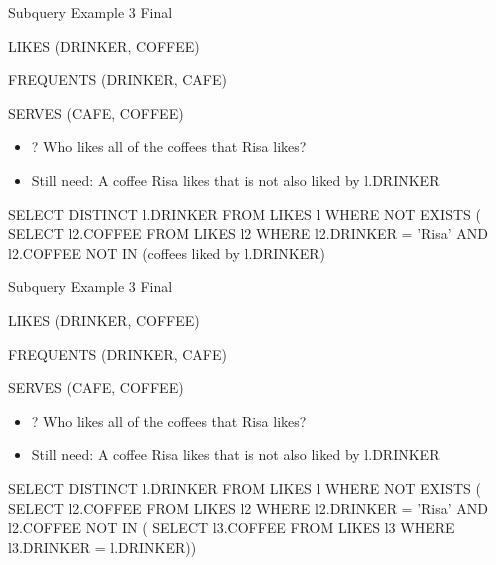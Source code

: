 \documentclass[aspectratio=169]{beamer}
\newenvironment{noindentitemize}
{ \begin{itemize}
 \setlength{\itemsep}{1.5ex}
  \setlength{\parsep}{0pt}   
  \setlength{\parskip}{0pt}
 \addtolength{\leftskip}{-2em}
 }
{ \end{itemize} }
\begin{document}
\begin{frame}[fragile]{Subquery Example 3 Final}

LIKES (DRINKER, COFFEE)

FREQUENTS (DRINKER, CAFE)

SERVES (CAFE, COFFEE)


\begin{noindentitemize}
\item[?] Who likes all of the coffees that Risa likes?
\item Still need: A coffee Risa likes that is not also liked by l.DRINKER
\end{noindentitemize}

\begin{SQL}
SELECT DISTINCT l.DRINKER
FROM LIKES l
WHERE NOT EXISTS (
  SELECT l2.COFFEE 
  FROM LIKES l2
  WHERE l2.DRINKER = 'Risa' 
    AND l2.COFFEE NOT IN (coffees liked by l.DRINKER)
\end{SQL}
\end{frame}


\begin{frame}[fragile]{Subquery Example 3 Final}

LIKES (DRINKER, COFFEE)

FREQUENTS (DRINKER, CAFE)

SERVES (CAFE, COFFEE)


\begin{noindentitemize}
\item[?] Who likes all of the coffees that Risa likes?
\item Still need: A coffee Risa likes that is not also liked by l.DRINKER
\end{noindentitemize}

\begin{SQL}
SELECT DISTINCT l.DRINKER
FROM LIKES l
WHERE NOT EXISTS (
  SELECT l2.COFFEE 
  FROM LIKES l2
  WHERE l2.DRINKER = 'Risa' 
    AND l2.COFFEE NOT IN (
      SELECT l3.COFFEE
      FROM LIKES l3
      WHERE l3.DRINKER = l.DRINKER))
\end{SQL}
\end{frame}
\end{document}
